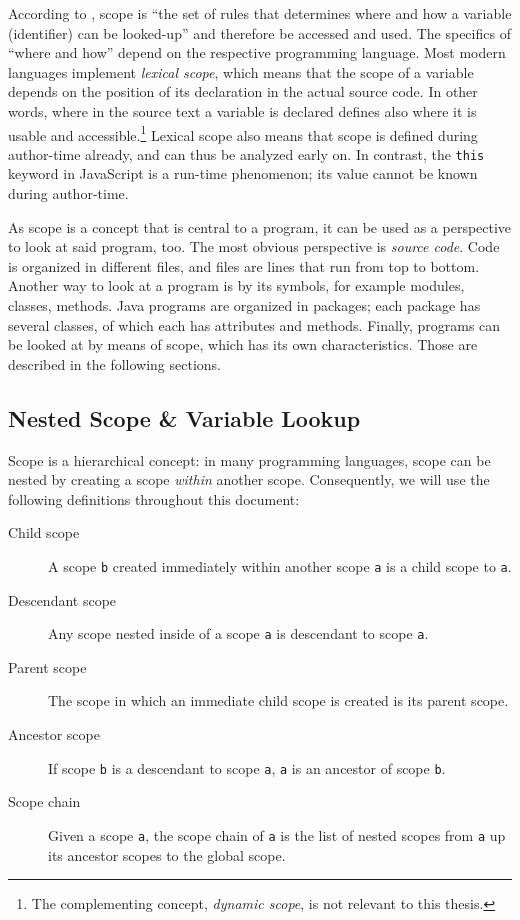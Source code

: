 According to , scope is “the set of rules that
determines where and how a \gls{variable} (\gls{identifier}) can be
looked-up” and therefore be accessed and used. The specifics of “where
and how” depend on the respective programming language. Most modern
languages implement \emph{lexical scope}, which means that the scope of
a variable depends on the position of its declaration in the actual
source code. In other words, where in the source text a variable is
declared defines also where it is usable and
accessible.\footnote{The complementing concept, \emph{dynamic scope}, is not relevant to this thesis.}
Lexical scope also means that scope is defined during author-time
already, and can thus be analyzed early on. In contrast, the
\texttt{this} keyword in JavaScript is a run-time phenomenon; its value
cannot be known during author-time.

As scope is a concept that is central to a program, it can be used as a
perspective to look at said program, too. The most obvious perspective
is \emph{source code}. Code is organized in different files, and files
are lines that run from top to bottom. Another way to look at a program
is by its symbols, for example modules, classes, methods. Java programs
are organized in packages; each package has several classes, of which
each has attributes and methods. Finally, programs can be looked at by
means of scope, which has its own characteristics. Those are described
in the following sections.

\subsection{Nested Scope \& Variable
Lookup}\label{nested-scope-variable-lookup}

Scope is a hierarchical concept: in many programming languages, scope
can be nested by creating a scope \emph{within} another scope.
Consequently, we will use the following definitions throughout this
document:

\begin{description}
\item[Child scope]
A scope \texttt{b} created immediately within another scope \texttt{a}
is a child scope to \texttt{a}.
\item[Descendant scope]
Any scope nested inside of a scope \texttt{a} is descendant to scope
\texttt{a}.
\item[Parent scope]
The scope in which an immediate child scope is created is its parent
scope.
\item[Ancestor scope]
If scope \texttt{b} is a descendant to scope \texttt{a}, \texttt{a} is
an ancestor of scope \texttt{b}.
\item[Scope chain]
Given a scope \texttt{a}, the scope chain of \texttt{a} is the list of
nested scopes from \texttt{a} up its ancestor scopes to the global
scope.
\end{description}

